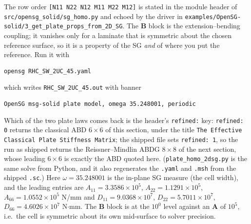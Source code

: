 
The row order \verb|[N11 N22 N12 M11 M22 M12]| is stated in the module header
of \texttt{src/opensg\_solid/sg\_homo.py} and echoed by the driver in
\texttt{examples/OpenSG-solid/3\_get\_plate\_props\_from\_2D\_SG}. The
$\mathbf B$ block is the extension--bending coupling; it vanishes only for a
laminate that is symmetric about the chosen reference surface, so it is a
property of the SG \emph{and} of where you put the reference. Run it with

\begin{lstlisting}[style=shellst]
opensg RHC_SW_2UC_45.yaml
\end{lstlisting}

which writes \texttt{RHC\_SW\_2UC\_45.out} with banner

\begin{Verbatim}[fontsize=\small,frame=single,framesep=4pt]
 OpenSG msg-solid plate model, omega 35.248001, periodic
\end{Verbatim}

\noindent
Which of the
two plate laws comes back is the header's \texttt{refined:} key:
\texttt{refined: 0} returns the classical ABD $6\times6$ of this section, under
the title \texttt{The Effective Classical Plate Stiffness Matrix}; the shipped
file sets \texttt{refined: 1}, so the run as shipped returns the
Reissner--Mindlin ABDG $8\times8$ of the next section, whose leading $6\times6$
is exactly the ABD quoted here. (\texttt{plate\_homo\_2dsg.py} is the same solve
from Python, and it also regenerates the \texttt{.yaml} and \texttt{.msh} from
the shipped \texttt{.sc}.) Here $\omega =
35.248001$ is the in-plane SG measure (the cell width), and the leading entries
are $A_{11} = 3.3586\times10^{5}$, $A_{22} = 1.1291\times10^{5}$,
$A_{66} = 1.0552\times10^{5}$ N/mm and $D_{11} = 9.0368\times10^{7}$,
$D_{22} = 5.7011\times10^{7}$, $D_{66} = 4.6026\times10^{7}$ N$\cdot$mm. The
$\mathbf B$ block is at the $10^{0}$ level against an $\mathbf A$ of $10^{5}$,
i.e.\ the cell is symmetric about its own mid-surface to solver precision.

